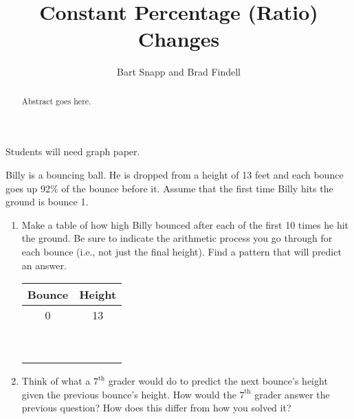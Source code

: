 \documentclass{ximera}
\title{Constant Percentage (Ratio) Changes}
\author{Bart Snapp and Brad Findell}
\begin{document}
\begin{abstract}
Abstract goes here.  
\end{abstract}
\maketitle

\label{A:ConstantRatio}
\begin{teachingnote}
Students will need graph paper.
\end{teachingnote}

\begin{problem}
Billy is a bouncing ball.  He is dropped from a height of 13 feet and each bounce goes up 92\% of the bounce before it.  Assume that the first time Billy hits the ground is bounce 1.  

\begin{enumerate}
\item Make a table of how high Billy bounced after each of the first 10 times he hit the ground.  Be sure to indicate the arithmetic process you go through for each bounce (i.e., not just the final height).  Find a pattern that will predict an answer.  

{\renewcommand{\arraystretch}{1.4}
\begin{tabular}{c|c}
        Bounce    & Height \\
\hline
         0       &          13        \\
                 &                      \\
                 &                      \\
                 &                      \\
                 &                      \\
                 &                      \\
                 &                      \\
                 &                      \\
                 &                      \\
                 &                      \\
\end{tabular}
}

\item Think of what a $7^\mathrm{th}$ grader would do to predict the next bounce's height given the previous bounce's height.  How would the $7^\mathrm{th}$ grader answer the previous question?  How does this differ from how you solved it?


\end{enumerate}
\end{problem}
\end{document}
